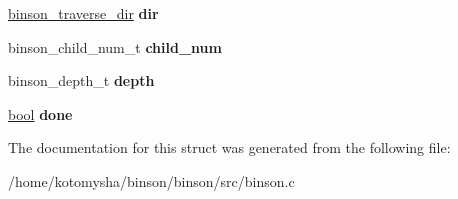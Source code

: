 \begin{DoxyCompactItemize}
\item 
\hypertarget{structbinson__traverse__cb__status___a9ec403931a64f22695b34465c2f58142}{\hyperlink{binson_8h_ab501064f394fe221de93ef8a06adaa73}{binson\-\_\-traverse\-\_\-dir} {\bfseries dir}}\label{structbinson__traverse__cb__status___a9ec403931a64f22695b34465c2f58142}

\item 
\hypertarget{structbinson__traverse__cb__status___a1ec02137db4c442c9df3f41c17555622}{binson\-\_\-child\-\_\-num\-\_\-t {\bfseries child\-\_\-num}}\label{structbinson__traverse__cb__status___a1ec02137db4c442c9df3f41c17555622}

\item 
\hypertarget{structbinson__traverse__cb__status___a7b95a5dd911353fa5a2020c9a9a1c928}{binson\-\_\-depth\-\_\-t {\bfseries depth}}\label{structbinson__traverse__cb__status___a7b95a5dd911353fa5a2020c9a9a1c928}

\item 
\hypertarget{structbinson__traverse__cb__status___a1d39aac66e12dae50a24cd7a9100ef33}{\hyperlink{binson__config_8h_abb452686968e48b67397da5f97445f5b}{bool} {\bfseries done}}\label{structbinson__traverse__cb__status___a1d39aac66e12dae50a24cd7a9100ef33}

\end{DoxyCompactItemize}


The documentation for this struct was generated from the following file\-:\begin{DoxyCompactItemize}
\item 
/home/kotomysha/binson/binson/src/binson.\-c\end{DoxyCompactItemize}
